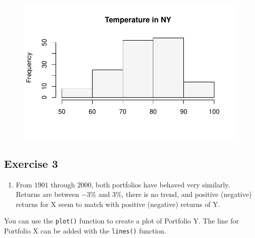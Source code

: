 \documentclass[
  letterpaper,
  DIV=11,
  numbers=noendperiod]{scrreprt}
\providecommand{\tightlist}{%
  \setlength{\itemsep}{0pt}\setlength{\parskip}{0pt}}\usepackage{longtable,booktabs,array}
\begin{document}
\begin{figure}[H]

{\centering \includegraphics{./03-DescriptiveII_files/figure-pdf/unnamed-chunk-13-1.pdf}

}

\end{figure}

\hypertarget{exercise-3-3}{%
\subsection*{Exercise 3}\label{exercise-3-3}}

\begin{enumerate}
\def\labelenumi{\arabic{enumi}.}
\tightlist
\item
  From \(1901\) through \(2000\), both portfolios have behaved very
  similarly. Returns are between \(-3\)\% and \(3\)\%, there is no
  trend, and positive (negative) returns for X seem to match with
  positive (negative) returns of Y.
\end{enumerate}

You can use the \texttt{plot()} function to create a plot of Portfolio
Y. The line for Portfolio X can be added with the \texttt{lines()}
function.
\end{document}
